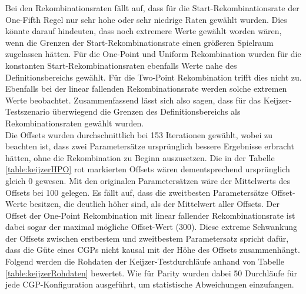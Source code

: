 Bei den Rekombinationsraten fällt auf, dass für die Start-Rekombinationsrate der One-Fifth Regel nur sehr hohe oder sehr niedrige Raten gewählt wurden.
Dies könnte darauf hindeuten, dass noch extremere Werte gewählt worden wären, wenn die Grenzen der Start-Rekombinationsrate einen größeren Spielraum zugelassen hätten.
Für die One-Point und Uniform Rekombination wurden für die konstanten Start-Rekombinationsraten ebenfalls Werte nahe des Definitionsbereichs gewählt.
Für die Two-Point Rekombination trifft dies nicht zu.
Ebenfalls bei der linear fallenden Rekombinationsrate werden solche extremen Werte beobachtet.
Zusammenfassend lässt sich also sagen, dass für das Keijzer-Testszenario überwiegend die Grenzen des Definitionsbereichs als Rekombinationsraten gewählt wurden.\\
Die Offsets wurden durchschnittlich bei 153 Iterationen gewählt, wobei zu beachten ist, dass zwei Parametersätze ursprünglich bessere Ergebnisse erbracht hätten, ohne die Rekombination zu Beginn auszusetzen.
Die in der Tabelle \ref{table:keijzerHPO} rot markierten Offsets wären dementsprechend ursprünglich gleich 0 gewesen.
Mit den originalen Parametersätzen wäre der Mittelwerts des Offsets bei 100 gelegen.
Es fällt auf, dass die zweitbesten Parametersätze Offset-Werte besitzen, die deutlich höher sind, als der Mittelwert aller Offsets.
Der Offset der One-Point Rekombination mit linear fallender Rekombinationsrate ist dabei sogar der maximal mögliche Offset-Wert (300).
Diese extreme Schwankung der Offsets zwischen erstbestem und zweitbestem Parametersatz spricht dafür, dass die Güte eines CGPs nicht kausal mit der Höhe des Offsets zusammenhängt.\\

Folgend werden die Rohdaten der Keijzer-Testdurchläufe anhand von Tabelle \ref{table:keijzerRohdaten} bewertet.
Wie für Parity wurden dabei 50 Durchläufe für jede CGP-Konfiguration ausgeführt, um statistische Abweichungen einzufangen.


